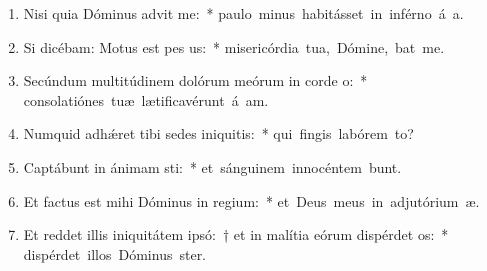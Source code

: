 \begin{flushleft}
\begin{enumerate}[leftmargin=*]
\item Nisi quia Dóminus advit me:~* \mbox{paulo minus habitásset in inférno á a.}
\item Si dicébam: Motus est pes us:~* \mbox{misericórdia tua, Dómine, bat me.}
\item Secúndum multitúdinem dolórum meórum in corde o:~* \mbox{consolatiónes tuæ lætificavérunt á am.}
\item Numquid adh\'{\ae}ret tibi sedes iniquitis:~* \mbox{qui fingis labórem  to?}
\item Captábunt in ánimam sti:~* \mbox{et sánguinem innocéntem bunt.}
\item Et factus est mihi Dóminus in regium:~* \mbox{et Deus meus in adjutórium  æ.}
\item Et reddet illis iniquitátem ipsó:~† et in malítia eórum dispérdet os:~* \mbox{dispérdet illos Dóminus  ster.}


\end{enumerate}
\end{flushleft}

